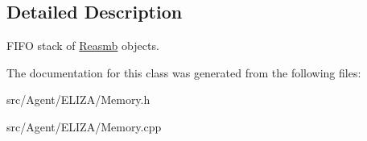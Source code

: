 \subsection{Detailed Description}
F\+I\+FO stack of \mbox{\hyperlink{classReasmb}{Reasmb}} objects. 

The documentation for this class was generated from the following files\+:\begin{DoxyCompactItemize}
\item 
src/\+Agent/\+E\+L\+I\+Z\+A/Memory.\+h\item 
src/\+Agent/\+E\+L\+I\+Z\+A/Memory.\+cpp\end{DoxyCompactItemize}
